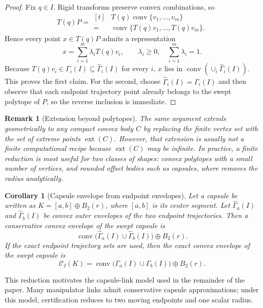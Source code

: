 \documentclass[journal]{IEEEtran}
\newtheorem{remark}{Remark}
\newtheorem{corollary}{Corollary}
\begin{document}
\begin{proof}
Fix $q\in I$. Rigid transforms preserve convex combinations, so
\[
T(q)P
= \begin{aligned}[t]
&T(q)\operatorname{conv}\{v_1,\dots,v_m\} \\
=\;&\operatorname{conv}\{T(q)v_1,\dots,T(q)v_m\}.
\end{aligned}
\]
Hence every point $x \in T(q)P$ admits a representation
\[
x = \sum_{i=1}^m \lambda_i T(q)v_i,
\qquad \lambda_i\ge 0,
\quad \sum_{i=1}^m \lambda_i = 1.
\]
Because $T(q)v_i \in \Gamma_i(I) \subseteq \widehat{\Gamma}_i(I)$ for every $i$,
$x$ lies in $\operatorname{conv}(\cup_i \widehat{\Gamma}_i(I))$. This proves the
first claim. For the second, choose
$\widehat{\Gamma}_i(I)=\Gamma_i(I)$ and then observe that each endpoint
trajectory point already belongs to the swept polytope of $P$, so the reverse
inclusion is immediate.
\end{proof}

\begin{remark}[Extension beyond polytopes]\label{rem:general_convex}
The same argument extends geometrically to any compact convex body $C$ by
replacing the finite vertex set with the set of extreme points
$\operatorname{ext}(C)$. However, that extension is usually not a finite
computational recipe because $\operatorname{ext}(C)$ may be infinite. In
practice, a finite reduction is most useful for two classes of shapes: convex
polytopes with a small number of vertices, and rounded offset bodies such as
capsules, where  removes the radius analytically.
\end{remark}

\begin{corollary}[Capsule envelope from endpoint envelopes]
\label{cor:capsule_lift}
Let a capsule be written as $K=[a,b]\oplus B_2(r)$, where $[a,b]$ is its center
segment. Let $\widehat{\Gamma}_a(I)$ and $\widehat{\Gamma}_b(I)$ be convex outer
envelopes of the two endpoint trajectories. Then a conservative convex envelope
of the swept capsule is
\[
\operatorname{conv}\bigl(\widehat{\Gamma}_a(I) \cup
\widehat{\Gamma}_b(I)\bigr) \oplus B_2(r).
\]
If the exact endpoint trajectory sets are used, then the exact convex envelope
of the swept capsule is
\[
\mathcal{C}_I(K)
= \operatorname{conv}\bigl(\Gamma_a(I) \cup \Gamma_b(I)\bigr)
\oplus B_2(r).
\]
\end{corollary}

This reduction motivates the capsule-link model used in the remainder of the
paper. Many manipulator links admit conservative capsule approximations; under
this model, certification reduces to two moving endpoints and one scalar
radius.
\end{document}
